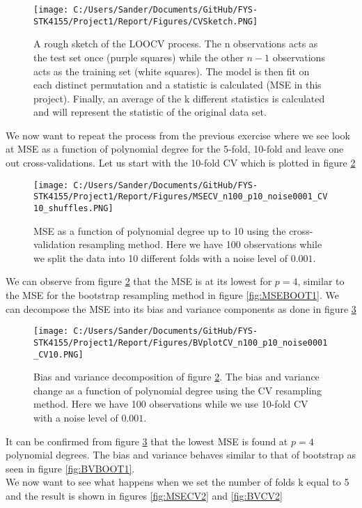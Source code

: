 \documentclass[12pt,a4paper]{article}
\begin{document}
\begin{figure}[H]
\centering
\texttt{[image: C:/Users/Sander/Documents/GitHub/FYS-STK4155/Project1/Report/Figures/CVSketch.PNG]}
\caption{\label{fig:CVsketch} A rough sketch of the LOOCV process. The n observations acts as the test set once (purple squares) while the other $n-1$ observations acts as the training set (white squares). The model is then fit on each distinct permutation and a statistic is calculated (MSE in this project). Finally, an average of the k different statistics is calculated and will represent the statistic of the original data set.}
\end{figure}

\noindent We now want to repeat the process from the previous exercise where we see look at MSE as a function of polynomial degree for the 5-fold, 10-fold and leave one out cross-validations. Let us start with the 10-fold CV which is plotted in figure \ref{fig:MSECV1}

\begin{figure}[H]
\centering
\texttt{[image: C:/Users/Sander/Documents/GitHub/FYS-STK4155/Project1/Report/Figures/MSECV\_n100\_p10\_noise0001\_CV10\_shuffles.PNG]}
\caption{\label{fig:MSECV1} MSE as a function of polynomial degree up to 10 using the cross-validation resampling method. Here we have 100 observations while we split the data into 10 different folds with a noise level of $0.001$.}
\end{figure}

\noindent We can observe from figure \ref{fig:MSECV1} that the MSE is at its lowest for $p = 4$, similar to the MSE for the bootstrap resampling method in figure \ref{fig:MSEBOOT1}. We can decompose the MSE into its bias and variance components as done in figure \ref{fig:BVCV1}

\begin{figure}[H]
\centering
\texttt{[image: C:/Users/Sander/Documents/GitHub/FYS-STK4155/Project1/Report/Figures/BVplotCV\_n100\_p10\_noise0001\_CV10.PNG]}
\caption{\label{fig:BVCV1} Bias and variance decomposition of figure \ref{fig:MSECV1}. The bias and variance change as a function of polynomial degree using the CV resampling method. Here we have 100 observations while we use 10-fold CV with a noise level of $0.001$.}
\end{figure}

\noindent It can be confirmed from figure \ref{fig:BVCV1} that the lowest MSE is found at $p = 4$ polynomial degrees. The bias and variance behaves similar to that of bootstrap as seen in figure \ref{fig:BVBOOT1}. 
\\
We now want to see what happens when we set the number of folds k equal to 5 and the result is shown in figures \ref{fig:MSECV2} and \ref{fig:BVCV2}
\end{document}
